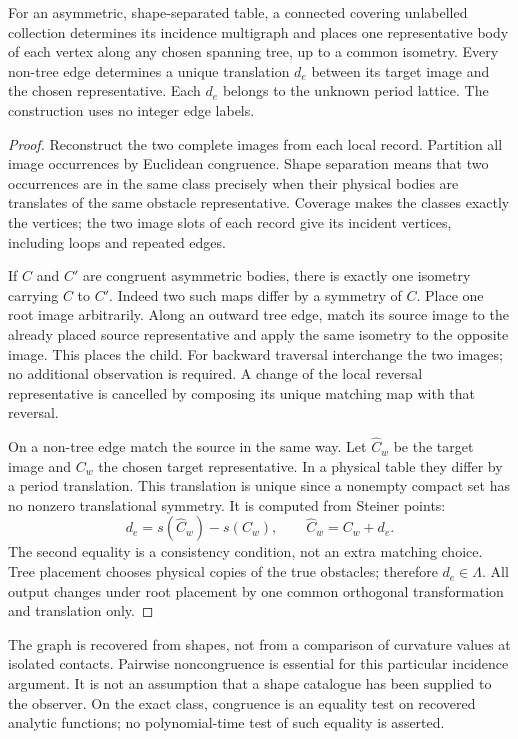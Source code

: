 \begin{lemma}\label{lem:incidence}
For an asymmetric, shape-separated table, a connected covering unlabelled
collection determines its incidence multigraph and places one representative
body of each vertex along any chosen spanning tree, up to a common isometry.
Every non-tree edge determines a unique translation $d_e$ between its
target image and the chosen representative. Each $d_e$ belongs to the
unknown period lattice. The construction uses no integer edge labels.
\end{lemma}
\begin{proof}
Reconstruct the two complete images from each local record. Partition
all image occurrences by Euclidean congruence. Shape separation means
that two occurrences are in the same class precisely when their physical
bodies are translates of the same obstacle representative. Coverage makes
the classes exactly the vertices; the two image slots of each record
give its incident vertices, including loops and repeated edges.

If $C$ and $C'$ are congruent asymmetric bodies, there is exactly one
isometry carrying $C$ to $C'$. Indeed two such maps differ by a symmetry
of $C$. Place one root image arbitrarily. Along an outward tree edge,
match its source image to the already placed source representative and
apply the same isometry to the opposite image. This places the child.
For backward traversal interchange the two images; no additional
observation is required. A change of the local reversal representative
is cancelled by composing its unique matching map with that reversal.

On a non-tree edge match the source in the same way. Let $\widehat C_w$
be the target image and $C_w$ the chosen target representative. In a
physical table they differ by a period translation. This translation is
unique since a nonempty compact set has no nonzero translational symmetry.
It is computed from Steiner points:
\begin{equation}\label{eq:cycle-displacement}
 d_e=s(\widehat C_w)-s(C_w),\qquad \widehat C_w=C_w+d_e.
\end{equation}
The second equality is a consistency condition, not an extra matching
choice. Tree placement chooses physical copies of the true obstacles;
therefore $d_e\in\Lambda$. All output changes under root placement by
one common orthogonal transformation and translation only.
\end{proof}

The graph is recovered from shapes, not from a comparison of curvature
values at isolated contacts. Pairwise noncongruence is essential for
this particular incidence argument. It is not an assumption that a
shape catalogue has been supplied to the observer. On the exact class,
congruence is an equality test on recovered analytic functions; no
polynomial-time test of such equality is asserted.

